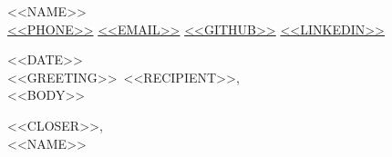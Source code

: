 \documentclass[11pt]{letter}
\newcommand{\myname}{<<NAME>>}
\newcommand{\myemail}{<<EMAIL>>}
\newcommand{\mygithub}{<<GITHUB>>}
\newcommand{\mylinkedin}{<<LINKEDIN>>}
\newcommand{\myphone}{<<PHONE>>}
\newcommand{\recipient}{<<RECIPIENT>>}
\newcommand{\greeting}{<<GREETING>>}
\newcommand{\closer}{<<CLOSER>>}
\begin{document}
\AddToShipoutPictureBG{%
  \color{gr}
  \AtPageUpperLeft{\rule[-1.3in]{\paperwidth}{1.3in}}
}

\begin{center}
    {\fontsize{28}{0}\selectfont\scshape \myname} \\[0.2cm]
    \href{tel:\myphone}{\fontsize{9.5}{0}\selectfont\faPhone \hspace{.2em}\myphone}
    \hfill
    \href{mailto:\myemail}{\fontsize{9.5}{0}\selectfont\faEnvelope \hspace{.2em}\myemail}\hfill
    \href{https://github.com/\mygithub}{\fontsize{9.5}{0}\selectfont\faGithub \hspace{.2em}\mygithub}\hfill
    \href{https://linkedin.com/in/\mylinkedin}{\fontsize{9.5}{0}\selectfont\faLinkedinIn \hspace{.2em}\mylinkedin}
\end{center}

\vspace{0.2in}

<<DATE>> \\

\vspace{-0.1in}\greeting\ \recipient, \\

\vspace{-0.1in}\setlength\parindent{24pt}
\noindent <<BODY>>

\vspace{0.1in}
\vfill
\begin{flushright}
\closer, \\
\myname
\end{flushright}
\end{document}
